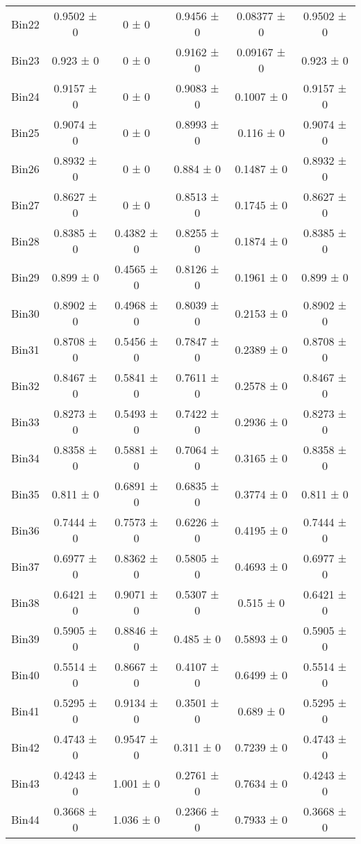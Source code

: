 \begin{tabular}{@{\extracolsep{4pt}}lccccc@{}}
     Bin22 & 0.9502 ± 0 & 0 ± 0 & 0.9456 ± 0 & 0.08377 ± 0 & 0.9502 ± 0 \\ 
     Bin23 & 0.923 ± 0 & 0 ± 0 & 0.9162 ± 0 & 0.09167 ± 0 & 0.923 ± 0 \\ 
     Bin24 & 0.9157 ± 0 & 0 ± 0 & 0.9083 ± 0 & 0.1007 ± 0 & 0.9157 ± 0 \\ 
     Bin25 & 0.9074 ± 0 & 0 ± 0 & 0.8993 ± 0 & 0.116 ± 0 & 0.9074 ± 0 \\ 
     Bin26 & 0.8932 ± 0 & 0 ± 0 & 0.884 ± 0 & 0.1487 ± 0 & 0.8932 ± 0 \\ 
     Bin27 & 0.8627 ± 0 & 0 ± 0 & 0.8513 ± 0 & 0.1745 ± 0 & 0.8627 ± 0 \\ 
     Bin28 & 0.8385 ± 0 & 0.4382 ± 0 & 0.8255 ± 0 & 0.1874 ± 0 & 0.8385 ± 0 \\ 
     Bin29 & 0.899 ± 0 & 0.4565 ± 0 & 0.8126 ± 0 & 0.1961 ± 0 & 0.899 ± 0 \\ 
     Bin30 & 0.8902 ± 0 & 0.4968 ± 0 & 0.8039 ± 0 & 0.2153 ± 0 & 0.8902 ± 0 \\ 
     Bin31 & 0.8708 ± 0 & 0.5456 ± 0 & 0.7847 ± 0 & 0.2389 ± 0 & 0.8708 ± 0 \\ 
     Bin32 & 0.8467 ± 0 & 0.5841 ± 0 & 0.7611 ± 0 & 0.2578 ± 0 & 0.8467 ± 0 \\ 
     Bin33 & 0.8273 ± 0 & 0.5493 ± 0 & 0.7422 ± 0 & 0.2936 ± 0 & 0.8273 ± 0 \\ 
     Bin34 & 0.8358 ± 0 & 0.5881 ± 0 & 0.7064 ± 0 & 0.3165 ± 0 & 0.8358 ± 0 \\ 
     Bin35 & 0.811 ± 0 & 0.6891 ± 0 & 0.6835 ± 0 & 0.3774 ± 0 & 0.811 ± 0 \\ 
     Bin36 & 0.7444 ± 0 & 0.7573 ± 0 & 0.6226 ± 0 & 0.4195 ± 0 & 0.7444 ± 0 \\ 
     Bin37 & 0.6977 ± 0 & 0.8362 ± 0 & 0.5805 ± 0 & 0.4693 ± 0 & 0.6977 ± 0 \\ 
     Bin38 & 0.6421 ± 0 & 0.9071 ± 0 & 0.5307 ± 0 & 0.515 ± 0 & 0.6421 ± 0 \\ 
     Bin39 & 0.5905 ± 0 & 0.8846 ± 0 & 0.485 ± 0 & 0.5893 ± 0 & 0.5905 ± 0 \\ 
     Bin40 & 0.5514 ± 0 & 0.8667 ± 0 & 0.4107 ± 0 & 0.6499 ± 0 & 0.5514 ± 0 \\ 
     Bin41 & 0.5295 ± 0 & 0.9134 ± 0 & 0.3501 ± 0 & 0.689 ± 0 & 0.5295 ± 0 \\ 
     Bin42 & 0.4743 ± 0 & 0.9547 ± 0 & 0.311 ± 0 & 0.7239 ± 0 & 0.4743 ± 0 \\ 
     Bin43 & 0.4243 ± 0 & 1.001 ± 0 & 0.2761 ± 0 & 0.7634 ± 0 & 0.4243 ± 0 \\ 
     Bin44 & 0.3668 ± 0 & 1.036 ± 0 & 0.2366 ± 0 & 0.7933 ± 0 & 0.3668 ± 0 \\ 

\end{tabular}

